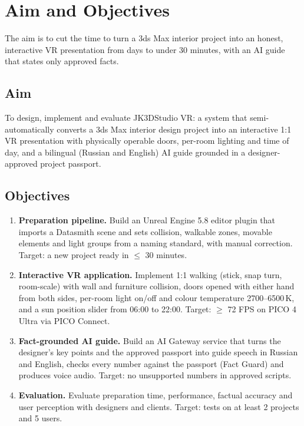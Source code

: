 \chapter{Aim and Objectives} %
\label{Chapter2}

The aim is to cut the time to turn a 3ds Max interior project into an honest, interactive VR presentation from days to under 30 minutes, with an AI guide that states only approved facts.

\section{Aim}

To design, implement and evaluate JK3DStudio VR: a system that semi-automatically converts a 3ds Max interior design project into an interactive 1:1 VR presentation with physically operable doors, per-room lighting and time of day, and a bilingual (Russian and English) AI guide grounded in a designer-approved project passport.

\section{Objectives}

\begin{enumerate}[label=\textbf{O\arabic*.}]
\item \textbf{Preparation pipeline.} Build an Unreal Engine 5.8 editor plugin that imports a Datasmith scene and sets collision, walkable zones, movable elements and light groups from a naming standard, with manual correction. Target: a new project ready in $\le$ 30 minutes.
\item \textbf{Interactive VR application.} Implement 1:1 walking (stick, snap turn, room-scale) with wall and furniture collision, doors opened with either hand from both sides, per-room light on/off and colour temperature 2700--6500\,K, and a sun position slider from 06:00 to 22:00. Target: $\ge$ 72 FPS on PICO 4 Ultra via PICO Connect.
\item \textbf{Fact-grounded AI guide.} Build an AI Gateway service that turns the designer's key points and the approved passport into guide speech in Russian and English, checks every number against the passport (Fact Guard) and produces voice audio. Target: no unsupported numbers in approved scripts.
\item \textbf{Evaluation.} Evaluate preparation time, performance, factual accuracy and user perception with designers and clients. Target: tests on at least 2 projects and 5 users.
\end{enumerate}


